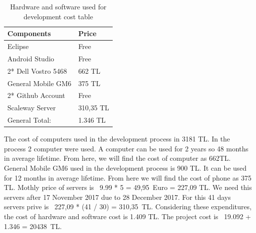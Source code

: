 \begin{table}[!h!]
\centering
\caption{Hardware and software used for development cost table}
\label{tab:hardsoftcost}
\begin{tabular}{|l|l|}
\hline
\textbf{Components}             & \multicolumn{1}{l|}{\textbf{Price}} \\ \hline
Eclipse \cite{eclipse} & Free \\ \hline
Android Studio \cite{androidStudio} & Free \\ \hline
2* Dell Vostro 5468 \cite{dell} & 662 TL \\ \hline
General Mobile GM6 \cite{gm6} & 375 TL                            \\ \hline
2* Github Account                  & Free                             \\ \hline
Scaleway Server                  & 310,35 TL                           \\ \hline
General Total:                  & 1.346 TL                            \\ \hline
\end{tabular}
\end{table}
The cost of computers used in the development process in 3181 TL\cite{dell}. In the process 2 computer were used. A computer can be used for 2 years so 48 months in average lifetime. From here, we will find the cost of computer as 662TL. General Mobile GM6 used in the development process is 900 TL\cite{gm6}. It can be used for 12 months in average lifetime. From here we will find the cost of phone as 375 TL. Mothly price of servers is \ 9.99 * 5 = 49,95\ Euro = 227,09 TL. We need this servers after 17 November 2017 due to 28 December 2017. For this 41 days servers prive is \ 227,09 * (41 / 30) = 310,35\ TL. Considering these expenditures, the cost of hardware and software cost is 1.409 TL. The project cost is \ 19.092 + 1.346 = 20438\ TL.

